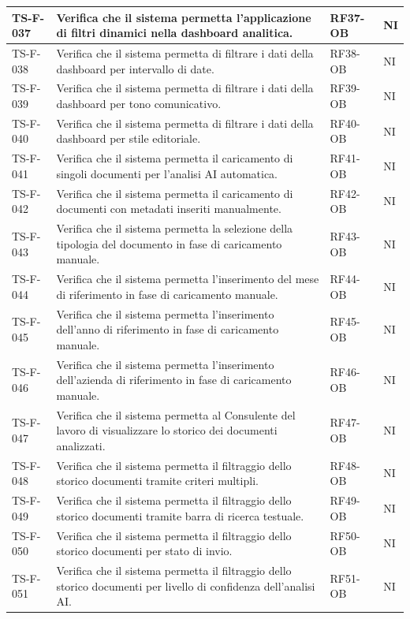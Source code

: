 \documentclass[a4paper,12pt]{article}
\begin{document}
\begin{longtable}{|p{2.2cm}|p{9.5cm}|p{2.3cm}|p{1.5cm}|}
    \hline
    TS-F-037 & Verifica che il sistema permetta l'applicazione di filtri dinamici nella dashboard analitica. & RF37-OB & NI \\
    \hline
    TS-F-038 & Verifica che il sistema permetta di filtrare i dati della dashboard per intervallo di date. & RF38-OB & NI \\
    \hline
    TS-F-039 & Verifica che il sistema permetta di filtrare i dati della dashboard per tono comunicativo. & RF39-OB & NI \\
    \hline
    TS-F-040 & Verifica che il sistema permetta di filtrare i dati della dashboard per stile editoriale. & RF40-OB & NI \\
    \hline
    TS-F-041 & Verifica che il sistema permetta il caricamento di singoli documenti per l'analisi AI automatica. & RF41-OB & NI \\
    \hline
    TS-F-042 & Verifica che il sistema permetta il caricamento di documenti con metadati inseriti manualmente. & RF42-OB & NI \\
    \hline
    TS-F-043 & Verifica che il sistema permetta la selezione della tipologia del documento in fase di caricamento manuale. & RF43-OB & NI \\
    \hline
    TS-F-044 & Verifica che il sistema permetta l'inserimento del mese di riferimento in fase di caricamento manuale. & RF44-OB & NI \\
    \hline
    TS-F-045 & Verifica che il sistema permetta l'inserimento dell'anno di riferimento in fase di caricamento manuale. & RF45-OB & NI \\
    \hline
    TS-F-046 & Verifica che il sistema permetta l'inserimento dell'azienda di riferimento in fase di caricamento manuale. & RF46-OB & NI \\
    \hline
    TS-F-047 & Verifica che il sistema permetta al Consulente del lavoro di visualizzare lo storico dei documenti analizzati. & RF47-OB & NI \\
    \hline
    TS-F-048 & Verifica che il sistema permetta il filtraggio dello storico documenti tramite criteri multipli. & RF48-OB & NI \\
    \hline
    TS-F-049 & Verifica che il sistema permetta il filtraggio dello storico documenti tramite barra di ricerca testuale. & RF49-OB & NI \\
    \hline
    TS-F-050 & Verifica che il sistema permetta il filtraggio dello storico documenti per stato di invio. & RF50-OB & NI \\
    \hline
    TS-F-051 & Verifica che il sistema permetta il filtraggio dello storico documenti per livello di confidenza dell'analisi AI. & RF51-OB & NI \\

\end{longtable}
\end{document}
